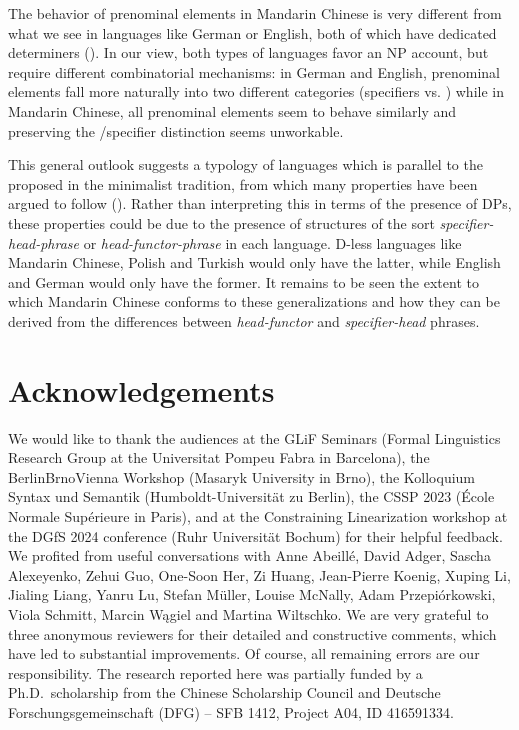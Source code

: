 \documentclass[output=paper,colorlinks,citecolor=brown]{langscibook}
\begin{document}
The behavior of prenominal elements in Mandarin Chinese is very different from what we see in languages like German or English, both of which have dedicated determiners (\citealt{Pollard&Sag94a, MyP&Mueller21a}). In our view, both types of languages favor an NP account, but  require different combinatorial mechanisms: in German and English, prenominal elements fall more naturally into two different categories (specifiers vs. ) while in Mandarin Chinese, all prenominal elements seem to behave similarly and preserving the /specifier distinction seems unworkable.

This general outlook suggests a typology of languages which is parallel to the  proposed in the minimalist tradition, from which  many  properties have been argued to follow (\citealt{cheng1999bare, boskovic2008will, bovskovic2013word}). Rather than interpreting this in terms of the presence of DPs, these properties could be due to the presence of structures of the sort  \textit{specifier-head-phrase}  or  \textit{head-functor-phrase} in each language. D-less languages like Mandarin Chinese, Polish and Turkish would only have the latter, while English and German would only have the former. It remains to be seen the extent to which Mandarin Chinese conforms to these generalizations and how they can be derived from the differences between \textit{head-functor} and \textit{specifier-head} phrases. 

\section*{Acknowledgements}

We would like to thank the audiences at the GLiF Seminars (Formal Linguistics Research Group at the Universitat Pompeu Fabra in Barcelona), the BerlinBrnoVienna Workshop (Masaryk University in Brno), the Kolloquium Syntax und Semantik (Humboldt-Universität zu Berlin), the CSSP 2023 (École Normale Supérieure in Paris), and at the Constraining Linearization workshop at the DGfS 2024 conference (Ruhr Universität Bochum) for their helpful feedback. We profited from useful conversations with Anne Abeillé, David Adger, Sascha Alexeyenko, Zehui Guo, One-Soon Her, Zi Huang, Jean-Pierre Koenig, Xuping Li, Jialing Liang, Yanru Lu, Stefan Müller, Louise McNally, Adam Przepiórkowski, Viola Schmitt, Marcin Wągiel and Martina Wiltschko. We are very grateful to three anonymous reviewers for their detailed and constructive comments, which have led to substantial improvements. Of course, all remaining errors are our responsibility. The research reported here was partially funded by a Ph.D.\ scholarship from the Chinese Scholarship Council and Deutsche Forschungsgemeinschaft (DFG) – SFB 1412, Project A04, ID 416591334.
\end{document}
